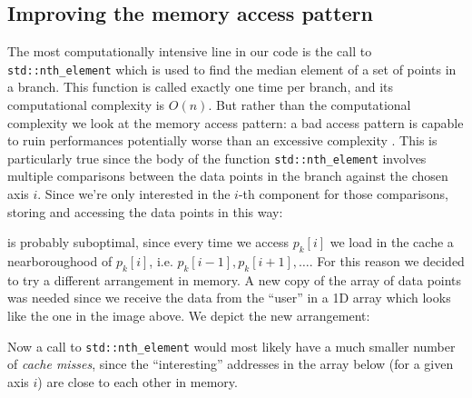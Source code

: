 \documentclass{article}
\begin{document}
\subsection{Improving the memory access pattern}
The most computationally intensive line in our code is the call to
\texttt{std::nth\_element} which is used to find the median element of a set of
points in a branch. This function is called exactly one time per branch, and its
computational complexity is $O(n)$. But rather than the computational complexity
we look at the memory access pattern: a bad access pattern is capable to ruin
performances potentially worse than an excessive complexity
\cite{hager2010introduction}. This is particularly true since the body of the
function \texttt{std::nth\_element} involves multiple comparisons between the
data points in the branch against the chosen axis $i$. Since we're only
interested in the $i$-th component for those comparisons, storing and accessing
the data points in this way:
\begin{figure}[H]
    \centering
\end{figure}
is probably suboptimal, since every time we access $p_k[i]$ we load in the cache
a nearboroughood of $p_k[i]$, i.e. $p_k[i-1], p_k[i+1], \dots$.
For this reason we decided to try a different arrangement in memory. A new
copy of the array of data points was needed since we receive the data from the
``user'' in a 1D array which looks like the one in the image above. We depict
the new arrangement:
\begin{figure}[H]
    \centering
\end{figure}
Now a call to \texttt{std::nth\_element} would most likely have a much smaller
number of \emph{cache misses}, since the ``interesting'' addresses in the array
below (for a given axis $i$) are close to each other in memory.
\end{document}
